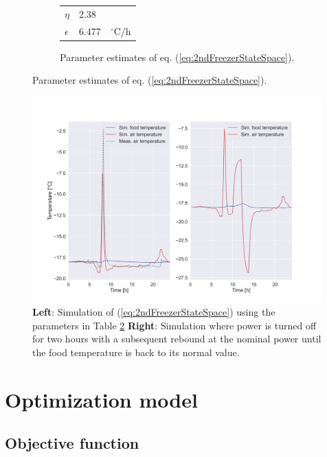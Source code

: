 \documentclass[11pt,a4paper]{article}
\begin{document}
\begin{figure}[!ht]
\begin{subfigure}[b]{.49\textwidth}
\begin{tabular}[b]{|l|l|l|}
            $\eta$          & 2.38  &                 \\
            $\epsilon$      & 6.477 & $^{\circ}$C/h   \\ \hline
        \end{tabular}
        \newline
        \newline
        \newline
        \caption{Parameter estimates of eq. (\ref{eq:2ndFreezerStateSpace}). \newline \newline}%
        \label{tab:2ndFreezerParam}
    \end{subfigure}
\end{figure}


\begin{figure}[H]
    \centering
    \includegraphics[width=0.99\textwidth]{figures/2ndFreezerModelSimulation.png}
    \caption{ \textbf{Left}: Simulation of (\ref{eq:2ndFreezerStateSpace}) using the parameters in Table \ref{tab:2ndFreezerParam} \textbf{Right}: Simulation where power is turned off for two hours with a subsequent rebound at the nominal power until the food temperature is back to its normal value.}
    \label{fig:2ndFreezerModelSimulation}
\end{figure}

\section{Optimization model}

\subsection{Objective function}
\end{document}
